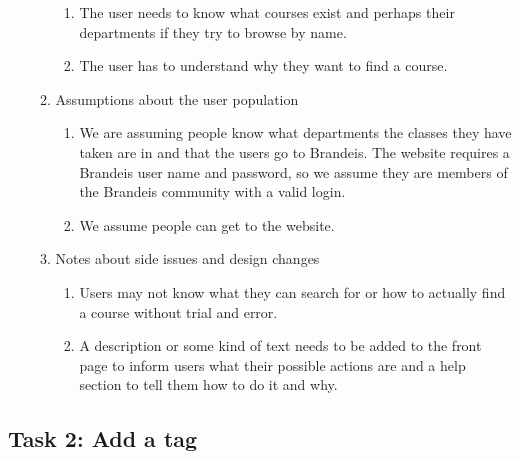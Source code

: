 \documentclass[12pt]{report}
\begin{document}
\begin{enumerate}
\begin{enumerate}
    	\begin{enumerate}
    	\item The user needs to know what courses exist and perhaps their departments if they try to browse by name.
        \item The user has to understand why they want to find a course. 
       	\end{enumerate}
    \item Assumptions about the user population
        \begin{enumerate}
    	\item We are assuming people know what departments the classes they have taken are in and that the users go to Brandeis. The website requires a Brandeis user name and password, so we assume they are members of the Brandeis community with a valid login.
        \item We assume people can get to the website.
        \end{enumerate}
    \item Notes about side issues and design changes
        \begin{enumerate}
    	\item Users may not know what they can search for or how to actually find a course without trial and error.
        \item A description or some kind of text needs to be added to the front page to inform users what their possible actions are and a help section to tell them how to do it and why. 
        \end{enumerate}
	\end{enumerate}
\end{enumerate}

\subsection{Task 2: Add a tag}
\end{document}
